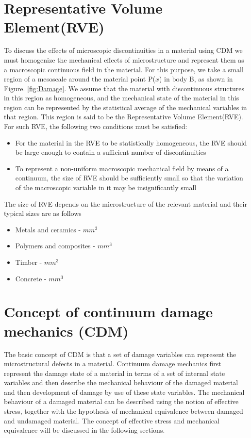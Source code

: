\documentclass[12pt]{report}
\begin{document}
\section{Representative Volume Element(RVE)}
\indent\indent\indent  To discuss the effects of microscopic discontinuities in a material using CDM we must homogenize the mechanical effects of microstructure and represent them as a macroscopic continuous field in the material. For this purpose, we take a small region of a mesoscale around the material point P($x$) in body B, as shown in Figure. \ref{fig:Damage}. We assume that the material with discontinuous structures in this region as homogeneous, and the mechanical state of the material in this region can be represented by the statistical average of the mechanical variables in that region. This region is said to be the Representative Volume Element(RVE). For such RVE, the following two conditions must be satisfied:
\begin{itemize}
\item  For the material in the RVE to be statistically homogeneous, the RVE should be large enough to contain a sufficient number of discontinuities
\item To represent a non-uniform macroscopic mechanical field by means of a continuum, the size of RVE should be sufficiently small so that the variation of the macroscopic variable in it may be insignificantly small
\end{itemize}
The size of RVE depends on the microstructure of the relevant material and their typical sizes are as follows
\begin{itemize}
\item Metals and ceramics  \;    -    \;$mm^3$
\item Polymers and composites \;   -   \;$mm^3$
\item Timber\; - \;$mm^3$
\item Concrete \; - \;$mm^3$
\end{itemize}

\section{Concept of continuum damage mechanics (CDM)}
\indent\indent\indent The basic concept of CDM is that a set of damage variables can represent the microstructural defects in a material. Continuum damage mechanics first represent the damage state of a material in terms of a set of internal state variables and then describe the mechanical behaviour of the damaged material and then development of damage by use of these state variables. The mechanical behaviour of a damaged material can be described using the notion of effective stress, together with the hypothesis of mechanical equivalence between damaged and undamaged material. The concept of effective stress and mechanical equivalence will be discussed in the following sections.
\end{document}
